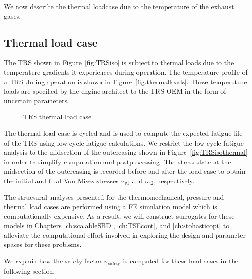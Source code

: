 We now describe the thermal loadcase due to the temperature of the exhaust gases.

\subsection{Thermal load case} \label{subsec:thermalloadcase}

The \ac{TRS} shown in Figure~\ref{fig:TRSiso} is subject to thermal loads due to the temperature gradients it experiences during operation. The temperature profile of a \ac{TRS} during operation is shown in Figure~\ref{fig:thermalloads}. These temperature loads are specified by the engine architect to the \ac{TRS} \ac{OEM} in the form of uncertain parameters.

\begin{figure}[h!]
	\centering
	 \hspace{0.1\textwidth}%
	\caption{\ac{TRS} thermal load case}
	\label{fig:thermalloadcases}
\end{figure}

The thermal load case is cycled and is used to compute the expected fatigue life of the \ac{TRS} using low-cycle fatigue calculations. We restrict the low-cycle fatigue analysis to the midsection of the outercasing shown in Figure~\ref{fig:TRSisothermal} in order to simplify computation and postprocessing. The stress state at the midsection of the outercasing is recorded before and after the load case to obtain the initial and final Von Mises stresses $\sigma_{v1}$ and $\sigma_{v2}$, respectively. 

The structural analyses presented for the thermomechanical, pressure and thermal load cases are performed using a \ac{FE} simulation model which is computationally expensive. As a result, we will construct surrogates for these models in Chapters \ref{ch:scalableSBD}, \ref{ch:TSEcont}, and \ref{ch:stohasticopt} to alleviate the computational effort involved in exploring the design and parameter spaces for these problems.

We explain how the safety factor $n_{\textrm{safety}}$ is computed for these load cases in the following section.

